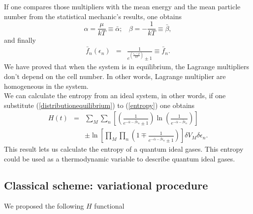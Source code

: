 \documentclass{article}
\begin{document}
If one compares those multipliers with the mean energy and the mean particle number from the statistical mechanic's results, one obtains
\begin{equation}
    \alpha=\frac{\mu}{kT}\equiv \bar{\alpha}; \ \ \ \ \beta=-\frac{1}{kT}\equiv \bar{\beta},
\end{equation}{}
and finally
\begin{eqnarray}
    \bar{f}_{n}(\epsilon_{n})&=&\frac{1}{e^{(\frac{{\epsilon_n}-\bar{\mu}}{kT})}\pm 1}\equiv \bar{f}_{n}.
\end{eqnarray}{}
We have proved that when the system is in equilibrium, the Lagrange multipliers don't depend on the cell number. In other words, Lagrange multiplier are homogeneous in the system.\\
We can calculate the entropy from an ideal system, in other words, if one substitute (\ref{distributionequilibrium}) to (\ref{entropy}) one obtains
\begin{eqnarray}
      H(t)&=&\sum_M \sum_n  \left[\left(\frac{1}{e^{-\bar{\alpha}-\bar{\beta}\epsilon_{n}}\pm 1} \right)\ln \left(\frac{1}{e^{-\bar{\alpha}-\bar{\beta}\epsilon_{n}}} \right) \right]\nonumber \\
      &&\pm  \ln \left[\prod_{M} \prod_{n}\left(1 \mp \frac{1}{e^{-\bar{\alpha}-\bar{\beta}\epsilon_{n}}\pm 1} \right) \right]\delta V_M \delta \epsilon_n\label{H-entropy}.
  \end{eqnarray}
  This result lets us calculate the entropy of a quantum ideal gases. This entropy could be used as a thermodynamic variable to describe quantum ideal gases.
\subsection{Classical scheme: variational procedure}
We proposed the following $H$ functional
\end{document}
